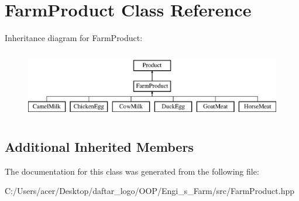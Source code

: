 \hypertarget{class_farm_product}{}\section{Farm\+Product Class Reference}
\label{class_farm_product}
Inheritance diagram for Farm\+Product\+:\begin{figure}[H]
\begin{center}
\leavevmode
\includegraphics[height=3.000000cm]{class_farm_product}
\end{center}
\end{figure}
\subsection*{Additional Inherited Members}


The documentation for this class was generated from the following file\+:\begin{DoxyCompactItemize}
\item 
C\+:/\+Users/acer/\+Desktop/daftar\+\_\+logo/\+O\+O\+P/\+Engi\+\_\+s\+\_\+\+Farm/src/Farm\+Product.\+hpp\end{DoxyCompactItemize}
